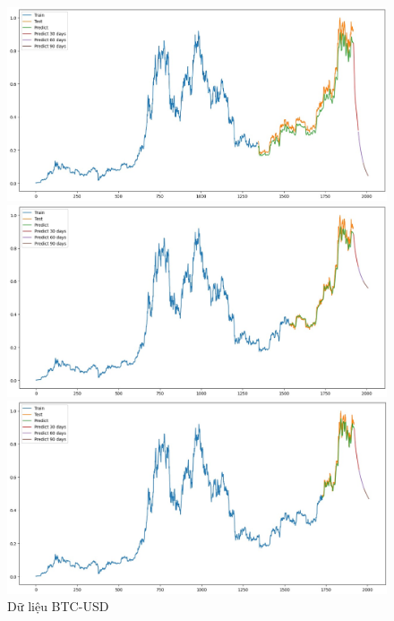 \documentclass[conference]{IEEEtran}
\begin{document}
\begin{figure}[H]
    \centering
    \begin{minipage}{0.15\textwidth}
    \centering
    \includegraphics[width=1\textwidth]{Figure/LSTM_BTC_7.jpg}
    \end{minipage}
    \hfill
    \begin{minipage}{0.15\textwidth}
    \centering
    \includegraphics[width=1\textwidth]{Figure/LSTM_BTC_8.jpg}
    \end{minipage}
    \hfill
    \begin{minipage}{0.15\textwidth}
    \centering
    \includegraphics[width=1\textwidth]{Figure/LSTM_BTC_9.jpg}
    \end{minipage}
    \caption{Dữ liệu BTC-USD}
    \label{fig:1}
\end{figure}
\end{document}
